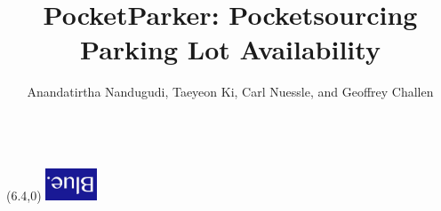 


\date{}


\author{
  \alignauthor Anandatirtha Nandugudi, Taeyeon Ki, Carl Nuessle, and Geoffrey Challen\\
  \\
}

\title{PocketParker: Pocketsourcing Parking Lot Availability}

\maketitle

\ifdefined\isblue
\begin{textblock}{1}(6.4,0)
\noindent\href{http://blue.cse.buffalo.edu}{\includegraphics[width=0.6in]{./figures/logos/blue.jpg}}
\end{textblock}
\fi









\clearpage

\balance
{\footnotesize


}


